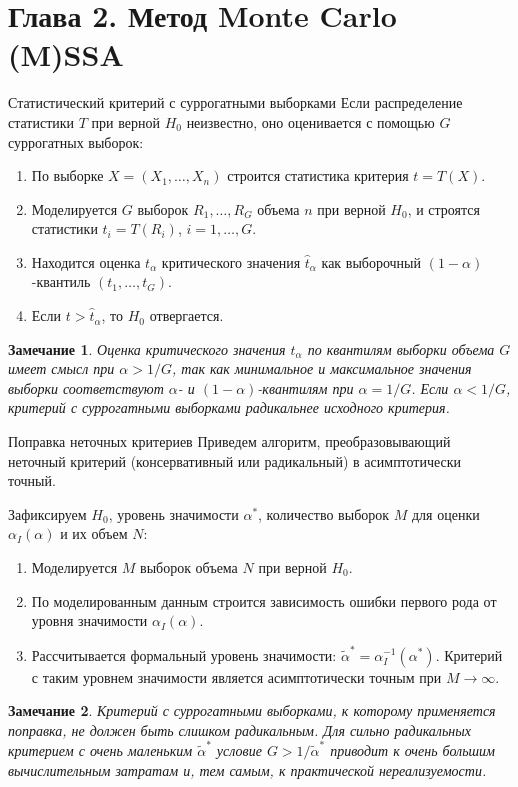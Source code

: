 \documentclass[pdf,notheorems,10pt,intlimits, unicode]{beamer}
\newtheorem{remark}{Замечание}
\begin{document}
\section{Глава 2. Метод Monte Carlo (M)SSA}
\begin{frame}{Статистический критерий с суррогатными выборками}
  Если распределение статистики $T$ при верной $H_0$ неизвестно, оно оценивается с помощью $G$ суррогатных выборок:
  \begin{enumerate}
    \item По выборке $X=(X_1,\ldots, X_n)$ строится статистика критерия $t=T(X)$.
    \item Моделируется $G$ выборок $R_1,\ldots, R_G$ объема $n$ при верной $H_0$, и строятся статистики $t_i=T(R_i)$, $i=1,\ldots, G$.
		\item Находится оценка $t_\alpha$ критического значения $\hat t_\alpha$ как выборочный $(1-\alpha)$-квантиль $(t_1,\ldots,t_G)$.
    \item Если $t>\hat t_\alpha$, то $H_0$ отвергается.
  \end{enumerate}

  \begin{remark}
    Оценка критического значения $t_\alpha$ по квантилям выборки объема $G$ имеет смысл при $\alpha>1/G$, так как минимальное и максимальное значения выборки соответствуют $\alpha$- и $(1-\alpha)$-квантилям при $\alpha = 1/G$. Если $\alpha < 1/G$, критерий с суррогатными выборками радикальнее исходного критерия.
  \end{remark}
\end{frame}

\begin{frame}{Поправка неточных критериев}
  Приведем алгоритм, преобразовывающий неточный критерий (консервативный или радикальный) в асимптотически точный.\medskip

  Зафиксируем $H_0$, уровень значимости $\alpha^*$, количество выборок $M$ для оценки $\alpha_I(\alpha)$ и их объем $N$:
  \begin{enumerate}
    \item Моделируется $M$ выборок объема $N$ при верной $H_0$.
    \item По моделированным данным строится зависимость ошибки первого рода от уровня значимости $\alpha_I(\alpha)$.
    \item Рассчитывается формальный уровень значимости: $\widetilde{\alpha}^*=\alpha_I^{-1}(\alpha^*)$. Критерий с таким уровнем значимости является асимптотически точным при $M\to\infty$.
   \end{enumerate}

  \begin{remark}
    Критерий с суррогатными выборками, к которому применяется поправка, не должен быть слишком радикальным. Для сильно радикальных критерием с очень маленьким $\widetilde\alpha^*$ условие $G > 1/\widetilde\alpha^*$ приводит к очень большим вычислительным затратам и, тем самым, к практической нереализуемости.
  \end{remark}
\end{frame}
\end{document}
